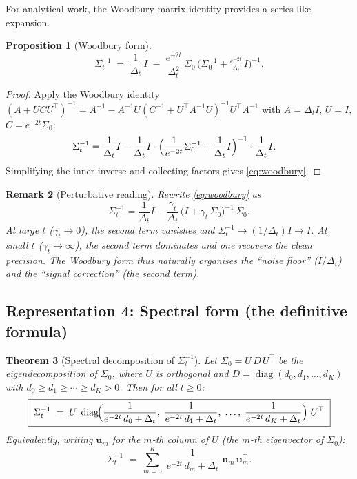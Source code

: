 \documentclass[11pt,a4paper]{article}
\newtheorem{theorem}{Theorem}[section]
\newtheorem{proposition}[theorem]{Proposition}
\newtheorem{remark}[theorem]{Remark}
\newcommand{\diag}{\operatorname{diag}}
\newcommand{\Dt}{\Delta_t}
\begin{document}
For analytical work, the Woodbury matrix identity provides a series-like expansion.

\begin{proposition}[Woodbury form]\label{prop:woodbury}
\begin{equation}\label{eq:woodbury}
  \Sigma_t^{-1} \;=\; \frac{1}{\Dt}\,I \;-\; \frac{e^{-2t}}{\Dt^2}\,\Sigma_0\,\bigl(\Sigma_0^{-1} + \tfrac{e^{-2t}}{\Dt}\,I\bigr)^{-1}.
\end{equation}
\end{proposition}

\begin{proof}
Apply the Woodbury identity $(A + UCU^\top)^{-1} = A^{-1} - A^{-1}U(C^{-1} + U^\top A^{-1}U)^{-1}U^\top A^{-1}$ with $A = \Dt I$, $U = I$, $C = e^{-2t}\Sigma_0$:
\begin{align*}
\Sigma_t^{-1}
&= \frac{1}{\Dt}I - \frac{1}{\Dt}I \cdot \Bigl(\frac{1}{e^{-2t}}\Sigma_0^{-1} + \frac{1}{\Dt}I\Bigr)^{-1}\cdot \frac{1}{\Dt}I.
\end{align*}
Simplifying the inner inverse and collecting factors gives \eqref{eq:woodbury}.
\end{proof}

\begin{remark}[Perturbative reading]\label{rem:perturbative}
Rewrite \eqref{eq:woodbury} as
\[
  \Sigma_t^{-1} = \frac{1}{\Dt}I - \frac{\gamma_t}{\Dt}\,\bigl(I + \gamma_t\,\Sigma_0\bigr)^{-1}\,\Sigma_0.
\]
At large $t$ ($\gamma_t \to 0$), the second term vanishes and $\Sigma_t^{-1} \to (1/\Dt)I \to I$.  At small $t$ ($\gamma_t \to \infty$), the second term dominates and one recovers the clean precision.  The Woodbury form thus naturally organises the ``noise floor'' ($I/\Dt$) and the ``signal correction'' (the second term).
\end{remark}

\subsection{Representation 4: Spectral form (the definitive formula)}
\label{sec:spectral}

\begin{theorem}[Spectral decomposition of $\Sigma_t^{-1}$]\label{thm:spectral}
Let $\Sigma_0 = U\,D\,U^\top$ be the eigendecomposition of $\Sigma_0$, where $U$ is orthogonal and $D = \diag(d_0, d_1, \dots, d_K)$ with $d_0 \geq d_1 \geq \cdots \geq d_K > 0$.  Then for \emph{all} $t \geq 0$:
\begin{equation}\label{eq:spectral-form}
  \boxed{\;\Sigma_t^{-1} \;=\; U\;\diag\!\Bigl(\frac{1}{e^{-2t}\,d_0 + \Dt},\;\frac{1}{e^{-2t}\,d_1 + \Dt},\;\dots,\;\frac{1}{e^{-2t}\,d_K + \Dt}\Bigr)\;U^\top\;}
\end{equation}
Equivalently, writing $\mathbf{u}_m$ for the $m$-th column of $U$ (the $m$-th eigenvector of $\Sigma_0$):
\begin{equation}\label{eq:spectral-sum}
  \Sigma_t^{-1} \;=\; \sum_{m=0}^{K}\;\frac{1}{e^{-2t}\,d_m + \Dt}\;\mathbf{u}_m\,\mathbf{u}_m^\top.
\end{equation}
\end{theorem}
\end{document}
